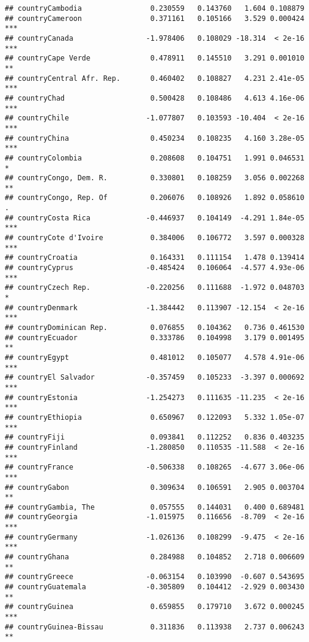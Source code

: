 \documentclass[
  11pt,
]{article}
\begin{document}
\begin{verbatim}
## countryCambodia                0.230559   0.143760   1.604 0.108879    
## countryCameroon                0.371161   0.105166   3.529 0.000424 ***
## countryCanada                 -1.978406   0.108029 -18.314  < 2e-16 ***
## countryCape Verde              0.478911   0.145510   3.291 0.001010 ** 
## countryCentral Afr. Rep.       0.460402   0.108827   4.231 2.41e-05 ***
## countryChad                    0.500428   0.108486   4.613 4.16e-06 ***
## countryChile                  -1.077807   0.103593 -10.404  < 2e-16 ***
## countryChina                   0.450234   0.108235   4.160 3.28e-05 ***
## countryColombia                0.208608   0.104751   1.991 0.046531 *  
## countryCongo, Dem. R.          0.330801   0.108259   3.056 0.002268 ** 
## countryCongo, Rep. Of          0.206076   0.108926   1.892 0.058610 .  
## countryCosta Rica             -0.446937   0.104149  -4.291 1.84e-05 ***
## countryCote d'Ivoire           0.384006   0.106772   3.597 0.000328 ***
## countryCroatia                 0.164331   0.111154   1.478 0.139414    
## countryCyprus                 -0.485424   0.106064  -4.577 4.93e-06 ***
## countryCzech Rep.             -0.220256   0.111688  -1.972 0.048703 *  
## countryDenmark                -1.384442   0.113907 -12.154  < 2e-16 ***
## countryDominican Rep.          0.076855   0.104362   0.736 0.461530    
## countryEcuador                 0.333786   0.104998   3.179 0.001495 ** 
## countryEgypt                   0.481012   0.105077   4.578 4.91e-06 ***
## countryEl Salvador            -0.357459   0.105233  -3.397 0.000692 ***
## countryEstonia                -1.254273   0.111635 -11.235  < 2e-16 ***
## countryEthiopia                0.650967   0.122093   5.332 1.05e-07 ***
## countryFiji                    0.093841   0.112252   0.836 0.403235    
## countryFinland                -1.280850   0.110535 -11.588  < 2e-16 ***
## countryFrance                 -0.506338   0.108265  -4.677 3.06e-06 ***
## countryGabon                   0.309634   0.106591   2.905 0.003704 ** 
## countryGambia, The             0.057555   0.144031   0.400 0.689481    
## countryGeorgia                -1.015975   0.116656  -8.709  < 2e-16 ***
## countryGermany                -1.026136   0.108299  -9.475  < 2e-16 ***
## countryGhana                   0.284988   0.104852   2.718 0.006609 ** 
## countryGreece                 -0.063154   0.103990  -0.607 0.543695    
## countryGuatemala              -0.305809   0.104412  -2.929 0.003430 ** 
## countryGuinea                  0.659855   0.179710   3.672 0.000245 ***
## countryGuinea-Bissau           0.311836   0.113938   2.737 0.006243 ** 

\end{verbatim}
\end{document}
